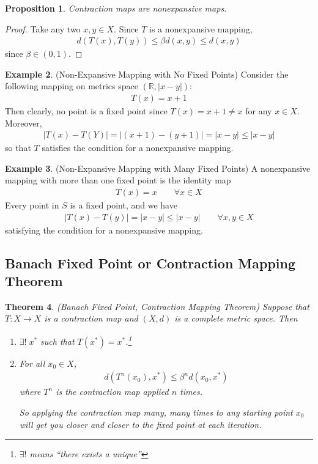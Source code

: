 \documentclass[12pt]{article}
\numberwithin{equation}{section} %
\theoremstyle{plain}
\newtheorem{thm}{Theorem}[section]
\newtheorem{prop}[thm]{Proposition}
\theoremstyle{definition}
\newtheorem{ex}[thm]{Example}
\theoremstyle{remark}
\newcommand{\R}{\mathbb{R}}
\begin{document}
\begin{prop}
Contraction maps are nonexpansive maps.
\end{prop}
\begin{proof}
Take any two $x,y\in X$. Since $T$ is a nonexpansive mapping,
\begin{align*}
  d(T(x),T(y)) \leq \beta d(x,y) \leq d(x,y)
\end{align*}
since $\beta \in (0,1)$.
\end{proof}

\begin{ex}(Non-Expansive Mapping with No Fixed Points)
Consider the following mapping on metrics space $(\R,|x-y|)$:
\begin{align*}
  T(x) = x+1
\end{align*}
Then clearly, no point is a fixed point since $T(x)=x+1\neq x$
for any $x\in X$. Moreover,
\begin{align*}
  |T(x)-T(Y)| = |(x+1)-(y+1)| = |x-y|\leq |x-y|
\end{align*}
so that $T$ satisfies the condition for a nonexpansive mapping.
\end{ex}

\begin{ex}(Non-Expansive Mapping with Many Fixed Points)
A nonexpansive mapping with more than one fixed point is the
identity map
\begin{align*}
  T(x) = x
  \qquad \forall x\in X
\end{align*}
Every point in $S$ is a fixed point, and we have
\begin{align*}
  |T(x)-T(y)| = |x-y| \leq |x-y|
  \qquad\forall x,y\in X
\end{align*}
satisfying the condition for a nonexpansive mapping.
\end{ex}

\clearpage
\subsection{Banach Fixed Point or Contraction Mapping Theorem}

\begin{thm}{\emph{(Banach Fixed Point, Contraction Mapping Theorem)}}
\label{thm:banach}
Suppose that $T:X\rightarrow X$ is a contraction map and $(X,d)$ is a
complete metric space. Then
\begin{enumerate}
  \item $\exists! \; x^*$ such that $T(x^*)=x^*$.\footnote{%
      $\exists!$ means ``there exists a unique''}
  \item For all $x_0 \in X$,
    \begin{align}
      \label{thm:fixed-bound1}
      d(T^n(x_0), x^*) \leq \beta^n d(x_0,x^*)
    \end{align}
    where $T^n$ is the contraction map applied $n$ times.

    So applying the contraction map many, many times to any starting
    point $x_0$ will get you closer and closer to the fixed point at
    each iteration.
\end{enumerate}
\end{thm}
\end{document}
